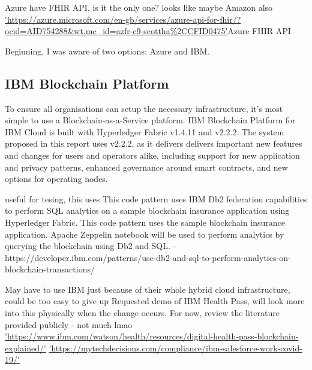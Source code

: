 Azure have FHIR API, is it the only one? looks like maybe Amazon also \url{'https://azure.microsoft.com/en-gb/services/azure-api-for-fhir/?ocid=AID754288&wt.mc_id=azfr-c9-scottha%2CCFID0475'}{Azure FHIR API}
\linebreak[1]

Beginning, I was aware of two options: Azure and IBM.\linebreak[1]

\subsection{IBM Blockchain Platform}
To ensure all organisations can setup the necessary infrastructure, it's most simple to use a Blockchain-as-a-Service platform. 
IBM Blockchain Platform for IBM Cloud is built with Hyperledger Fabric v1.4.11 and v2.2.2. The system proposed in this report uses v2.2.2, as it delivers delivers important new features and changes for users and operators alike, including support for new application and privacy patterns, enhanced governance around smart contracts, and new options for operating nodes. \cite{noauthor_whats_nodate}

useful for tesing, this uses This code pattern uses IBM Db2 federation capabilities to perform SQL analytics on a sample blockchain insurance application using Hyperledger Fabric. 
This code pattern uses the sample blockchain insurance application. Apache Zeppelin notebook will be used to perform analytics by querying the blockchain using Db2 and SQL. - https://developer.ibm.com/patterns/use-db2-and-sql-to-perform-analytics-on-blockchain-transactions/

May have to use IBM just because of their whole hybrid cloud infrastructure, could be too easy to give up \cite{noauthor_ibm_2020}
\linebreak[1]
Requested demo of IBM Health Pass, will look more into this physically when the change occurs. For now, review the literature provided publicly - not much lmao \url{'https://www.ibm.com/watson/health/resources/digital-health-pass-blockchain-explained/'}
\url{'https://mytechdecisions.com/compliance/ibm-salesforce-work-covid-19/'}
